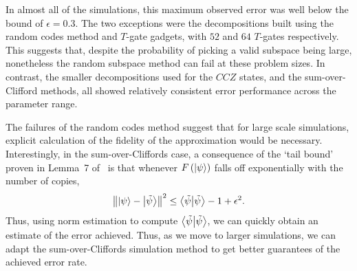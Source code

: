 In almost all of the simulations, this maximum observed error was well below the bound of $\epsilon=0.3$. The two exceptions were the decompositions built using the random codes method and $T$-gate gadgets, with $52$ and $64$ $T$-gates respectively. This suggests that, despite the probability of picking a valid subspace being large, nonetheless the random subspace method can fail at these problem sizes. In contrast, the smaller decompositions used for the $CCZ$ states, and the sum-over-Clifford methods, all showed relatively consistent error performance across the parameter range.\par
The failures of the random codes method  suggest that for large scale simulations, explicit calculation of the fidelity of the approximation would be necessary. Interestingly, in the sum-over-Cliffords case, a consequence of the `tail bound' proven in Lemma~7 of~\cite{Bravyi2018} is that whenever $F\left(\ket{\psi}\right)$ falls off exponentially with the number of copies,
\begin{equation}
\norm{\ket{\psi}-\ket{\tilde{\psi}}}^{2} \leq \braket{\tilde{\psi}} -1 + \epsilon^{2}.
\end{equation}
Thus, using norm estimation to compute $\braket{\tilde{\psi}}$, we can quickly obtain an estimate of the error achieved. Thus, as we move to larger simulations, we can adapt the sum-over-Cliffords simulation method to get better guarantees of the achieved error rate.
